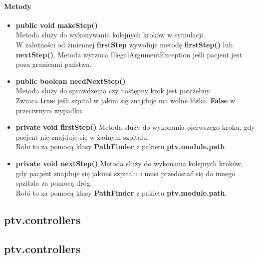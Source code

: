 \documentclass[]{article}
\begin{document}
                \paragraph{Metody}
                    \begin{itemize}
                        \item \textbf{public void makeStep()}\\
                            Metoda służy do wykonywania kolejnych kroków w symulacji.\\
                            W zależności od zmiennej \textbf{firstStep} wywołuje metodę \textbf{firstStep()} lub \textbf{nextStep()}.
                            Metoda wyrzuca IllegalArgumentException jeśli pacjent jest poza granicami państwa.
                        
                        \item \textbf{public boolean needNextStep()}\\
                            Metoda służy do sprawdzenia czy następny krok jest potrzebny.\\
                            Zwraca \textbf{true} jeśli szpital w jakim się znajduje ma wolne łóżka. \textbf{False} w przeciwnym wypadku.
                            
                        \item \textbf{private void firstStep()}
                            Metoda służy do wykonania pierwszego kroku, gdy pacjent nie znajduje się w żadnym szpitalu.\\
                            Robi to za pomocą klasy \textbf{PathFinder} z pakietu \textbf{ptv.module.path}.
                        \item \textbf{private void nextStep()}
                            Metoda służy do wykonania kolejnych kroków, gdy pacjent znajduje się jakimś szpitalu i musi przedostać się do innego spzitala za pomocą dróg.\\
                            Robi to za pomocą klasy \textbf{PathFinder} z pakietu \textbf{ptv.module.path}.
                    \end{itemize}
        
        \subsection{ptv.controllers} %
        \subsection{ptv.controllers} %
\end{document}
